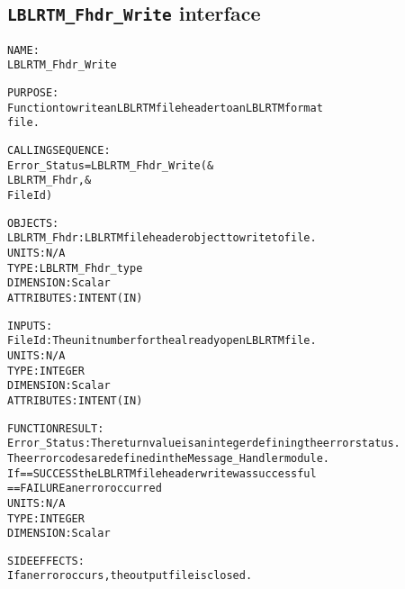 \subsection{\texttt{LBLRTM\_Fhdr\_Write} interface}
  \label{sec:LBLRTM_Fhdr_Write_interface}
  \begin{alltt}
 
  NAME:
        LBLRTM_Fhdr_Write
 
  PURPOSE:
        Function to write an LBLRTM file header to an LBLRTM format
        file.
 
  CALLING SEQUENCE:
        Error_Status = LBLRTM_Fhdr_Write( &
                         LBLRTM_Fhdr, &
                         FileId       )
 
  OBJECTS:
        LBLRTM_Fhdr:  LBLRTM file header object to write to file.
                      UNITS:      N/A
                      TYPE:       LBLRTM_Fhdr_type
                      DIMENSION:  Scalar
                      ATTRIBUTES: INTENT(IN)
 
  INPUTS:
        FileId:       The unit number for the already open LBLRTM file.
                      UNITS:      N/A
                      TYPE:       INTEGER
                      DIMENSION:  Scalar
                      ATTRIBUTES: INTENT(IN)
 
  FUNCTION RESULT:
        Error_Status: The return value is an integer defining the error status.
                      The error codes are defined in the Message_Handler module.
                      If == SUCCESS the LBLRTM file header write was successful
                         == FAILURE an error occurred
                      UNITS:      N/A
                      TYPE:       INTEGER
                      DIMENSION:  Scalar
 
  SIDE EFFECTS:
        If an error occurs, the output file is closed.
 
  \end{alltt}
